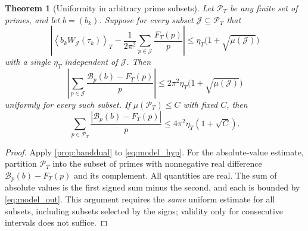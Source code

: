 \documentclass[11pt,reqno]{amsart}
\numberwithin{equation}{section}
\newtheorem{theorem}{Theorem}[section]
\newcommand{\av}[1]{\left\langle #1\right\rangle_T}
\begin{document}
\begin{theorem}[Uniformity in arbitrary prime subsets]\label{thm:subsets}
Let $\mathscr P_T$ be any finite set of primes, and let $b=(b_k)$. Suppose for every subset $\mathcal J\subseteq\mathscr P_T$ that
\begin{equation}\label{eq:model_hyp}
\left|\av{b_kW_{\mathcal J}(\tau_k)}-
\frac1{2\pi^2}\sum_{p\in\mathcal J}\frac{F_T(p)}p\right|
\le \eta_T\bigl(1+\sqrt{\mu(\mathcal J)}\bigr)
\end{equation}
with a single $\eta_T$ independent of $\mathcal J$. Then
\begin{equation}\label{eq:model_out}
\left|\sum_{p\in\mathcal J}\frac{\mathcal B_p(b)-F_T(p)}p\right|
\le2\pi^2\eta_T\bigl(1+\sqrt{\mu(\mathcal J)}\bigr)
\end{equation}
uniformly for every such subset. If $\mu(\mathscr P_T)\le C$ with fixed $C$, then
\begin{equation}\label{eq:absbound}
\sum_{p\in\mathscr P_T}\frac{|\mathcal B_p(b)-F_T(p)|}p
\le 4\pi^2\eta_T(1+\sqrt C).
\end{equation}
\end{theorem}
\begin{proof}
Apply \cref{prop:banddual} to \eqref{eq:model_hyp}. For the absolute-value estimate, partition $\mathscr P_T$ into the subset of primes with nonnegative real difference $\mathcal B_p(b)-F_T(p)$ and its complement. All quantities are real. The sum of absolute values is the first signed sum minus the second, and each is bounded by \eqref{eq:model_out}. This argument requires the \emph{same} uniform estimate for all subsets, including subsets selected by the signs; validity only for consecutive intervals does not suffice.
\end{proof}
\end{document}
